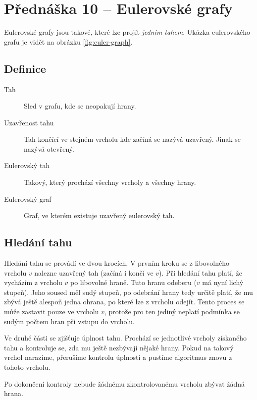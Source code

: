 \section{Přednáška 10 -- Eulerovské grafy}

Eulerovské grafy jsou takové, které lze projít \textit{jedním tahem}.
Ukázka eulerovského grafu je vidět na obrázku \ref{fig:euler-graph}.


\subsection{Definice}

\begin{description}
    \item[Tah] Sled v grafu, kde se neopakují hrany.
    \item[Uzavřenost tahu] Tah končící ve stejném vrcholu kde začíná se nazývá uzavřený.
    Jinak se nazývá otevřený.
    \item[Eulerovský tah] Takový, který prochází všechny vrcholy a všechny hrany.
    \item[Eulerovský graf] Graf, ve kterém existuje uzavřený eulerovský tah.
\end{description}


\subsection{Hledání tahu}

Hledání tahu se provádí ve dvou krocích.
V prvním kroku se z libovolného vrcholu $v$ nalezne uzavřený tah (začíná i končí ve $v$).
Při hledání tahu platí, že vycházím z vrcholu $v$ po libovolné hraně.
Tuto hranu odeberu ($v$ má nyní lichý stupeň).
Jeho soused měl sudý stupeň, po odebrání hrany tedy určitě platí, že mu zbývá ještě alespoň jedna ohrana, po které lze z vrcholu odejít.
Tento proces se může zastavit pouze ve vrcholu $v$, protože pro ten jediný neplatí podmínka se sudým počtem hran při vstupu do vrcholu.

Ve druhé části se zjišťuje úplnost tahu.
Prochází se jednotlivé vrcholy získaného tahu a kontroluje se, zda mu ještě nezbývají nějaké hrany.
Pokud na takový vrchol narazíme, přerušíme kontrolu úplnosti a pustíme algoritmus znovu z tohoto vrcholu.

Po dokončení kontroly nebude žádnému zkontrolovanému vrcholu zbývat žádná hrana.

